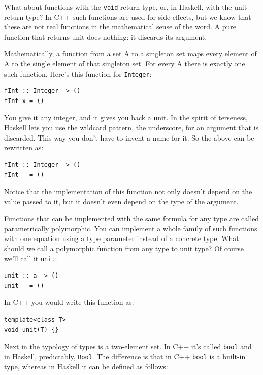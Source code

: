 What about functions with the \texttt{void} return type, or, in Haskell,
with the unit return type? In C++ such functions are used for side
effects, but we know that these are not real functions in the
mathematical sense of the word. A pure function that returns unit does
nothing: it discards its argument.

Mathematically, a function from a set A to a singleton set maps every
element of A to the single element of that singleton set. For every A
there is exactly one such function. Here's this function for
\texttt{Integer}:

\begin{verbatim}
fInt :: Integer -> ()
fInt x = ()
\end{verbatim}

You give it any integer, and it gives you back a unit. In the spirit of
terseness, Haskell lets you use the wildcard pattern, the underscore,
for an argument that is discarded. This way you don't have to invent a
name for it. So the above can be rewritten as:

\begin{verbatim}
fInt :: Integer -> ()
fInt _ = ()
\end{verbatim}

Notice that the implementation of this function not only doesn't depend
on the value passed to it, but it doesn't even depend on the type of the
argument.

Functions that can be implemented with the same formula for any type are
called parametrically polymorphic. You can implement a whole family of
such functions with one equation using a type parameter instead of a
concrete type. What should we call a polymorphic function from any type
to unit type? Of course we'll call it \texttt{unit}:

\begin{verbatim}
unit :: a -> ()
unit _ = ()
\end{verbatim}

In C++ you would write this function as:

\begin{verbatim}
template<class T>
void unit(T) {}
\end{verbatim}

Next in the typology of types is a two-element set. In C++ it's called
\texttt{bool} and in Haskell, predictably, \texttt{Bool}. The difference
is that in C++ \texttt{bool} is a built-in type, whereas in Haskell it
can be defined as follows:

